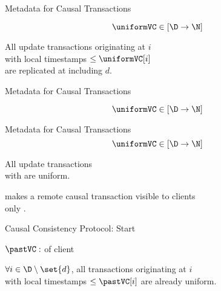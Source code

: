 \begin{frame}{Metadata for Causal Transactions}
  \begin{center}
    \[
      \uniformVC \in [\D \to \N]
    \]

    \begin{property}
      \begin{center}
        All update transactions originating at $i$ \\[3pt]
        with local timestamps $\le \uniformVC[i]$ \\[3pt]
        are replicated at  including $d$.
      \end{center}
    \end{property}
  \end{center}
\end{frame}

\begin{frame}{Metadata for Causal Transactions}

  \[
    \uniformVC \in [\D \to \N]
  \]

\end{frame}

\begin{frame}{Metadata for Causal Transactions}
  \[
    \uniformVC \in [\D \to \N]
  \]

  \begin{lemma}
    \begin{center}
      All update transactions \\[3pt]
      with  are uniform.
    \end{center}
  \end{lemma}

  \pause
  \vspace{0.30cm}
  \begin{center}
    \unistore{} makes a remote causal transaction visible to clients \\[3pt]
    only .
  \end{center}
\end{frame}

\begin{frame}{Causal Consistency Protocol: Start}
  \begin{center}
    $\pastVC:$  of client

    \vspace{0.20cm}
    \vspace{0.20cm}

    $\forall i \in \D \setminus \set{d}$,
    all transactions originating at $i$ \\[3pt]
    with local timestamps $\le \pastVC[i]$ are already uniform.
  \end{center}
\end{frame}

